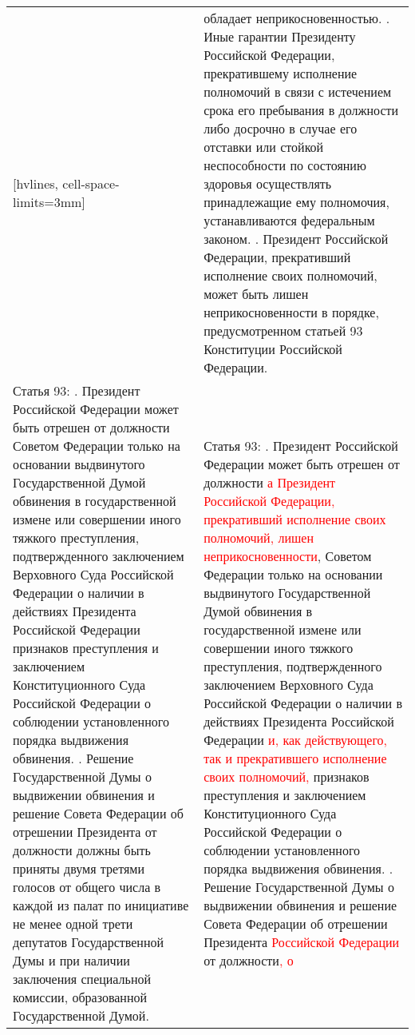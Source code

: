 \documentclass[a4paper,14pt]{extarticle}
\begin{document}
	\pagebreak
	\noindent
	\begin{NiceTabular}{p{92mm}p{91mm}}[hvlines, cell-space-limits=3mm]
		& обладает неприкосновенностью. . Иные гарантии Президенту Российской Федерации, прекратившему исполнение полномочий в связи с истечением срока его пребывания в должности либо досрочно в случае его отставки или стойкой неспособности по состоянию здоровья осуществлять принадлежащие ему полномочия, устанавливаются федеральным законом. . Президент Российской Федерации, прекративший исполнение своих полномочий, может быть лишен неприкосновенности в порядке, предусмотренном статьей 93 Конституции Российской Федерации. \\
		Статья 93: . Президент Российской Федерации может быть отрешен от должности Советом Федерации только на основании выдвинутого Государственной Думой обвинения в государственной измене или совершении иного тяжкого преступления, подтвержденного заключением Верховного Суда Российской Федерации о наличии в действиях Президента Российской Федерации признаков преступления и заключением Конституционного Суда Российской Федерации о соблюдении установленного порядка выдвижения обвинения. . Решение Государственной Думы о выдвижении обвинения и решение Совета Федерации об отрешении Президента от должности должны быть приняты двумя третями голосов от общего числа в каждой из палат по инициативе не менее одной трети депутатов Государственной Думы и при наличии заключения специальной комиссии, образованной Государственной Думой.
		&
		Статья 93: . Президент Российской Федерации может быть отрешен от должности \textcolor{red}{а Президент Российской Федерации, прекративший исполнение своих полномочий, лишен неприкосновенности}, Советом Федерации только на основании выдвинутого Государственной Думой обвинения в государственной измене или совершении иного тяжкого преступления, подтвержденного заключением Верховного Суда Российской Федерации о наличии в действиях Президента Российской Федерации \textcolor{red}{и, как действующего, так и прекратившего исполнение своих полномочий,} признаков преступления и заключением Конституционного Суда Российской Федерации о соблюдении установленного порядка выдвижения обвинения. . Решение Государственной Думы о выдвижении обвинения и решение Совета Федерации об отрешении Президента \textcolor{red}{Российской Федерации} от должности\textcolor{red}{, о}
	\end{NiceTabular}
	
\end{document}
